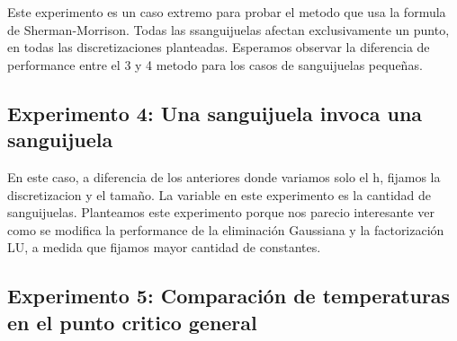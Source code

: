 Este experimento es un caso extremo para probar el metodo que usa la formula de Sherman-Morrison. Todas las ssanguijuelas afectan exclusivamente un punto,
en todas las discretizaciones planteadas. Esperamos observar la diferencia de performance entre el 3 y 4 metodo para los casos de sanguijuelas peque\~nas.

\subsection{Experimento 4: Una sanguijuela invoca una sanguijuela}

En este caso, a diferencia de los anteriores donde variamos solo el h, fijamos la discretizacion y el tama\~no. La variable en este experimento 
es la cantidad de sanguijuelas. Planteamos este experimento porque nos parecio interesante ver como se modifica la performance de la eliminaci\'on 
Gaussiana y la factorizaci\'on LU, a medida que fijamos mayor cantidad de constantes.

\subsection{Experimento 5: Comparaci\'on de temperaturas en el punto critico general}